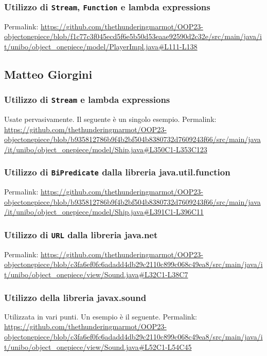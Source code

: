 \documentclass[a4paper,12pt]{report}
\begin{document}
\subsubsection{Utilizzo di \texttt{Stream}, \texttt{Function} e lambda expressions}
Permalink: \url{https://github.com/thethunderingmarmot/OOP23-objectonepiece/blob/f1c77c3f045ecd5f6e5b50d53eaae92590d2c32e/src/main/java/it/unibo/object_onepiece/model/PlayerImpl.java#L111-L138}

\subsection*{Matteo Giorgini}
\subsubsection{Utilizzo di \texttt{Stream} e lambda expressions}
Usate pervasivamente. Il seguente è un singolo esempio.
Permalink: \url{https://github.com/thethunderingmarmot/OOP23-objectonepiece/blob/b935812786b9f4b2bf504b8380732d7609243f66/src/main/java/it/unibo/object_onepiece/model/Ship.java#L350C1-L353C123}

\subsubsection{Utilizzo di \texttt{BiPredicate} dalla libreria java.util.function}
Permalink: \url{https://github.com/thethunderingmarmot/OOP23-objectonepiece/blob/b935812786b9f4b2bf504b8380732d7609243f66/src/main/java/it/unibo/object_onepiece/model/Ship.java#L391C1-L396C11}

\subsubsection{Utilizzo di \texttt{URL} dalla libreria java.net}
Permalink: \url{https://github.com/thethunderingmarmot/OOP23-objectonepiece/blob/c3fa6ef0fc6adadd4db29c2110c899c068c49ea8/src/main/java/it/unibo/object_onepiece/view/Sound.java#L32C1-L38C7}

\subsubsection{Utilizzo della libreria javax.sound}
Utilizzata in vari punti. Un esempio è il seguente. 
Permalink: \url{https://github.com/thethunderingmarmot/OOP23-objectonepiece/blob/c3fa6ef0fc6adadd4db29c2110c899c068c49ea8/src/main/java/it/unibo/object_onepiece/view/Sound.java#L52C1-L54C45}
\end{document}
